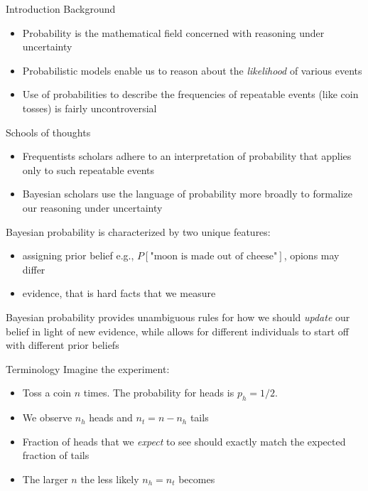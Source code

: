 {
    \small

    \begin{frame}{Introduction}
        Background
        \begin{itemize}
            \item Probability is the mathematical field concerned with reasoning under uncertainty
            \item Probabilistic models enable us to reason about the \emph{likelihood} of various events
            \item Use of probabilities to describe the frequencies of repeatable events
                  (like coin tosses) is fairly uncontroversial
        \end{itemize}

        Schools of thoughts
        \begin{itemize}
            \item Frequentists scholars adhere to an interpretation of probability that applies only to such repeatable events
            \item Bayesian scholars use the language of probability more broadly to formalize our reasoning under uncertainty
        \end{itemize}

        Bayesian probability is characterized by two unique features:
        \begin{itemize}
            \item assigning prior belief e.g., $P[\text{"moon is made out of cheese"}]$, opions may differ
            \item evidence, that is hard facts that we measure
        \end{itemize}
        Bayesian probability provides unambiguous rules for how we should \emph{update} our belief in light
        of new evidence, while allows for different individuals to start off with different prior beliefs
    \end{frame}

    \begin{frame}{Terminology}
        Imagine the experiment:
        \begin{itemize}
            \item Toss a coin $n$ times. The probability for heads is $p_h = 1/2$.
            \item We observe $n_h$ heads and $n_t = n - n_h$ tails
            \item Fraction of heads that we \emph{expect} to see should exactly match the expected fraction of tails
            \item The larger $n$ the less likely $n_h = n_t$ becomes
        \end{itemize}


\end{frame}}
